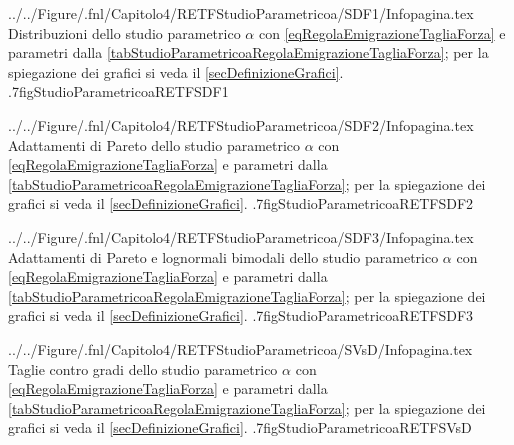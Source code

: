                     {../../Figure/.fnl/Capitolo4/RETFStudioParametricoa/SDF1/Infopagina.tex}
                    {Distribuzioni dello studio parametrico \(\alpha\) con \ref{eqRegolaEmigrazioneTagliaForza} e parametri dalla \cref{tabStudioParametricoaRegolaEmigrazioneTagliaForza}; per la spiegazione dei grafici si veda il \cref{secDefinizioneGrafici}.}
                    {.7\linewidth}{figStudioParametricoaRETFSDF1}
    
                    {../../Figure/.fnl/Capitolo4/RETFStudioParametricoa/SDF2/Infopagina.tex}
                    {Adattamenti di Pareto dello studio parametrico \(\alpha\) con \ref{eqRegolaEmigrazioneTagliaForza} e parametri dalla \cref{tabStudioParametricoaRegolaEmigrazioneTagliaForza}; per la spiegazione dei grafici si veda il \cref{secDefinizioneGrafici}.}
                    {.7\linewidth}{figStudioParametricoaRETFSDF2}
    
                    {../../Figure/.fnl/Capitolo4/RETFStudioParametricoa/SDF3/Infopagina.tex}
                    {Adattamenti di Pareto e lognormali bimodali dello studio parametrico \(\alpha\) con \ref{eqRegolaEmigrazioneTagliaForza} e parametri dalla \cref{tabStudioParametricoaRegolaEmigrazioneTagliaForza}; per la spiegazione dei grafici si veda il \cref{secDefinizioneGrafici}.}
                    {.7\linewidth}{figStudioParametricoaRETFSDF3}
    
                    {../../Figure/.fnl/Capitolo4/RETFStudioParametricoa/SVsD/Infopagina.tex}
                    {Taglie contro gradi dello studio parametrico \(\alpha\) con \ref{eqRegolaEmigrazioneTagliaForza} e parametri dalla \cref{tabStudioParametricoaRegolaEmigrazioneTagliaForza}; per la spiegazione dei grafici si veda il \cref{secDefinizioneGrafici}.}
                    {.7\linewidth}{figStudioParametricoaRETFSVsD}
                    
